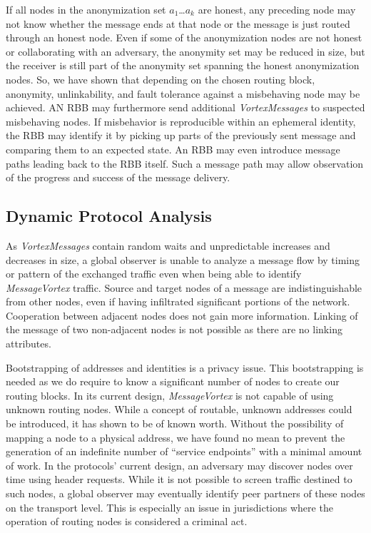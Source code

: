 \documentclass[acmsmall, screen, review]{acmart}
\begin{document}
	If all nodes in the anonymization set $a_1$\ldots$a_k$ are honest, any preceding node may not know whether the message ends at that node or the message is just routed through an honest node. Even if some of the anonymization nodes are not honest or collaborating with an adversary, the anonymity set may be reduced in size, but the receiver is still part of the anonymity set spanning the honest anonymization nodes. So, we have shown that depending on the chosen routing block, anonymity, unlinkability, and fault tolerance against a misbehaving node may be achieved. AN RBB may furthermore send additional \emph{VortexMessages} to suspected misbehaving nodes. If misbehavior is reproducible within an ephemeral identity, the RBB may identify it by picking up parts of the previously sent message and comparing them to an expected state. An RBB may even introduce message paths leading back to the RBB itself. Such a message path may allow observation of the progress and success of the message delivery.
	
	\subsection{Dynamic Protocol Analysis\label{sec:dynamicAnalysis}}
	As \emph{VortexMessages} contain random waits and unpredictable increases and decreases in size, a global observer is unable to analyze a message flow by timing or pattern of the exchanged traffic even when being able to identify \emph{MessageVortex} traffic. Source and target nodes of a message are indistinguishable from other nodes, even if having infiltrated significant portions of the network. Cooperation between adjacent nodes does not gain more information. Linking of the message of two non-adjacent nodes is not possible as there are no linking attributes.
	
	Bootstrapping of addresses and identities is a privacy issue. This bootstrapping is needed as we do require to know a significant number of nodes to create our routing blocks. In its current design, \emph{MessageVortex} is not capable of using unknown routing nodes. While a concept of routable, unknown addresses could be introduced, it has shown to be of known worth. Without the possibility of mapping a node to a physical address, we have found no mean to prevent the generation of an indefinite number of ``service endpoints'' with a minimal amount of work. In the protocols' current design, an adversary may discover nodes over time using header requests. While it is not possible to screen traffic destined to such nodes, a global observer may eventually identify peer partners of these nodes on the transport level. This is especially an issue in jurisdictions where the operation of routing nodes is considered a criminal act. 
	
\end{document}
